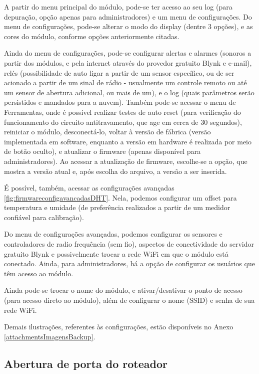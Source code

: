 A partir do menu principal do módulo, pode-se ter acesso ao seu log (para depuração, opção apenas para administradores) e um menu de configurações. Do menu de configurações, pode-se alterar o modo do display (dentre 3 opções), e as cores do módulo, conforme opções anteriormente citadas.

Ainda do menu de configurações, pode-se configurar alertas e alarmes (sonoros a partir dos módulos, e pela internet através do provedor gratuito Blynk e e-mail), relés (possibilidade de auto ligar a partir de um sensor específico, ou de ser acionado a partir de um sinal de rádio - usualmente um controle remoto ou até um sensor de abertura adicional, ou mais de um), e o log (quais parâmetros serão persistidos e mandados para a nuvem). Também pode-se acessar o menu de Ferramentas, onde é possível realizar testes de auto reset (para verificação do funcionamento do circuito antitravamento, que age em cerca de 30 segundos), reiniciar o módulo, desconectá-lo, voltar à versão de fábrica (versão implementada em software, enquanto a versão em hardware é realizada por meio de botão oculto), e atualizar o firmware (apenas disponível para administradores).
Ao acessar a atualização de firmware, escolhe-se a opção, que mostra a versão atual e, após escolha do arquivo, a versão a ser inserida.

É possível, também, acessar as configurações avançadas \ref{fig:firmwareconfigavancadasDHT}. Nela, podemos configurar um offset para temperatura e umidade (de preferência realizados a partir de um medidor confiável para calibração).

Do menu de configurações avançadas, podemos configurar os sensores e controladores de radio frequência (sem fio), aspectos de conectividade do servidor gratuito Blynk e possivelmente trocar a rede WiFi em que o módulo está conectado. Ainda, para administradores, há a opção de configurar os usuários que têm acesso ao módulo.

Ainda pode-se trocar o nome do módulo, e ativar/desativar o ponto de acesso (para acesso direto ao módulo), além de configurar o nome (SSID) e senha de sua rede WiFi.

Demais ilustrações, referentes às configurações, estão disponíveis no Anexo \ref{attachmentsImagensBackup}{}.

\subsection{Abertura de porta do roteador}

